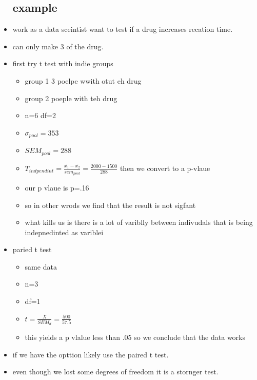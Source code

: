 \documentclass{article}
\begin{document}
\begin{itemize}
\subsection{example}
\item work as a data sceintist want to test if a drug increases recation time. 
\item can only make 3 of the drug.
\item first try t test with indie groups 
\begin{itemize}
    \item group 1 3 poelpe wwith otut eh drug 
    \item group 2 poeple with teh drug 
    \item n=6 df=2
    \item $\sigma_{pool}=353$
    \item $SEM_{pool}=288$
    \item $T_{indpendint}=\frac{\bar{x_1}-\bar{x_2}}{sem_{pool}}=\frac{2000-1500}{288}$ then we convert to a p-vlaue 
    \item our p vlaue is p=.16 
    \item so in other wrods we find that the result is not sigfant 
    \item what kills us is there is a lot of variblly between indivudals that is being indepnedinted as variblei
    
\end{itemize}

\item paried t test
\begin{itemize}
    \item same data 
    \item n=3
    \item df=1
    \item $t=\frac{\bar{X}}{SEM_{d}}=\frac{500}{57.5}$
    \item this yields a p vlalue less than .05 so we conclude that the data works
\end{itemize}
\item if we have the opttion likely use the paired t test. 
\item even though we lost some degrees of freedom it is a stornger test.

\end{itemize}
\end{document}
